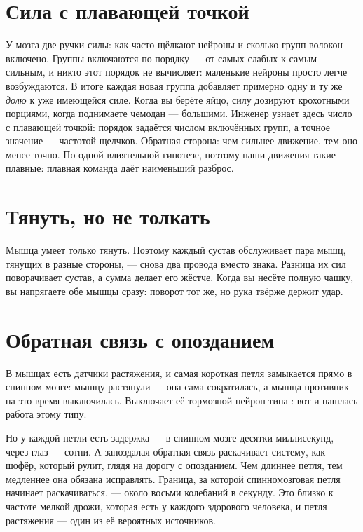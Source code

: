 \section*{Сила с плавающей точкой}

У мозга две ручки силы: как часто щёлкают нейроны и сколько групп волокон включено. Группы включаются по порядку --- от самых слабых к самым сильным, и никто этот порядок не вычисляет: маленькие нейроны просто легче возбуждаются. В итоге каждая новая группа добавляет примерно одну и ту же \emph{долю} к уже имеющейся силе. Когда вы берёте яйцо, силу дозируют крохотными порциями, когда поднимаете чемодан --- большими. Инженер узнает здесь число с плавающей точкой: порядок задаётся числом включённых групп, а точное значение --- частотой щелчков. Обратная сторона: чем сильнее движение, тем оно менее точно. По одной влиятельной гипотезе, поэтому наши движения такие плавные: плавная команда даёт наименьший разброс.

\section*{Тянуть, но не толкать}

Мышца умеет только тянуть. Поэтому каждый сустав обслуживает пара мышц, тянущих в разные стороны, --- снова два провода вместо знака. Разница их сил поворачивает сустав, а сумма делает его жёстче. Когда вы несёте полную чашку, вы напрягаете обе мышцы сразу: поворот тот же, но рука твёрже держит удар.


\section*{Обратная связь с опозданием}

В мышцах есть датчики растяжения, и самая короткая петля замыкается прямо в спинном мозге: мышцу растянули --- она сама сократилась, а мышца-противник на это время выключилась. Выключает её тормозной нейрон типа : вот и нашлась работа этому типу.

Но у каждой петли есть задержка --- в спинном мозге десятки миллисекунд, через глаз --- сотни. А запоздалая обратная связь раскачивает систему, как шофёр, который рулит, глядя на дорогу с опозданием. Чем длиннее петля, тем медленнее она обязана исправлять. Граница, за которой спинномозговая петля начинает раскачиваться, --- около восьми колебаний в секунду. Это близко к частоте мелкой дрожи, которая есть у каждого здорового человека, и петля растяжения --- один из её вероятных источников.

